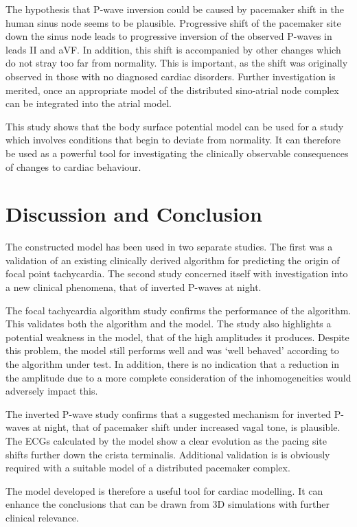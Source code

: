 The hypothesis that P-wave inversion could be caused by pacemaker shift in the
human sinus node seems to be plausible.
Progressive shift of the pacemaker site down the sinus node leads to progressive
inversion of the observed P-waves in leads II and aVF.
In addition, this shift is accompanied by other changes which do not stray too
far from normality.
This is important, as the shift was originally observed in those with no
diagnosed cardiac disorders.
Further investigation is merited, once an appropriate model of the distributed
sino-atrial node complex can be integrated into the atrial model.

This study shows that the body surface potential model can be used for a study
which involves conditions that begin to deviate from normality.
It can therefore be used as a powerful tool for investigating the clinically
observable consequences of changes to cardiac behaviour.

\section{Discussion and Conclusion}

The constructed model has been used in two separate studies.
The first was a validation of an existing clinically derived algorithm for
predicting the origin of focal point tachycardia.
The second study concerned itself with investigation into a new clinical
phenomena, that of inverted P-waves at night.


The focal tachycardia algorithm study confirms the performance of the algorithm.
This validates both the algorithm and the model.
The study also highlights a potential weakness in the model, that of the high
amplitudes it produces.
Despite this problem, the model still performs well and was `well behaved'
according to the algorithm under test.
In addition, there is no indication that a reduction in the amplitude due to a
more complete consideration of the inhomogeneities would adversely impact this.

The inverted P-wave study confirms that a suggested mechanism for inverted
P-waves at night, that of pacemaker shift under increased vagal tone, is
plausible.
The ECGs calculated by the model show a clear evolution as the pacing site
shifts further down the crista terminalis.
Additional validation is is obviously required with a suitable model of a
distributed pacemaker complex.

The model developed is therefore a useful tool for cardiac modelling.
It can enhance the conclusions that can be drawn from 3D simulations with
further clinical relevance.

